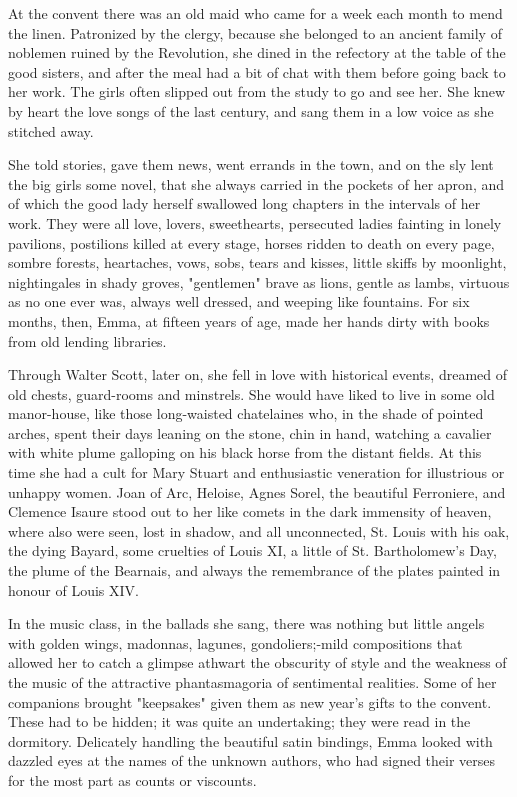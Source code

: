 \documentclass[11pt,twocolumn]{ltugboat}
\begin{document}
At the convent there was an old maid who came for a week each month to
mend the linen. Patronized by the clergy, because she belonged to an
ancient family of noblemen ruined by the Revolution, she dined in the
refectory at the table of the good sisters, and after the meal had a bit
of chat with them before going back to her work. The girls often slipped
out from the study to go and see her. She knew by heart the love songs
of the last century, and sang them in a low voice as she stitched away.

She told stories, gave them news, went errands in the town, and on
the sly lent the big girls some novel, that she always carried in the
pockets of her apron, and of which the good lady herself swallowed
long chapters in the intervals of her work. They were all love, lovers,
sweethearts, persecuted ladies fainting in lonely pavilions, postilions
killed at every stage, horses ridden to death on every page, sombre
forests, heartaches, vows, sobs, tears and kisses, little skiffs by
moonlight, nightingales in shady groves, "gentlemen" brave as lions,
gentle as lambs, virtuous as no one ever was, always well dressed, and
weeping like fountains. For six months, then, Emma, at fifteen years of
age, made her hands dirty with books from old lending libraries.

Through Walter Scott, later on, she fell in love with historical events,
dreamed of old chests, guard-rooms and minstrels. She would have liked
to live in some old manor-house, like those long-waisted chatelaines
who, in the shade of pointed arches, spent their days leaning on the
stone, chin in hand, watching a cavalier with white plume galloping on
his black horse from the distant fields. At this time she had a cult
for Mary Stuart and enthusiastic veneration for illustrious or unhappy
women. Joan of Arc, Heloise, Agnes Sorel, the beautiful Ferroniere, and
Clemence Isaure stood out to her like comets in the dark immensity of
heaven, where also were seen, lost in shadow, and all unconnected, St.
Louis with his oak, the dying Bayard, some cruelties of Louis XI, a
little of St. Bartholomew's Day, the plume of the Bearnais, and always
the remembrance of the plates painted in honour of Louis XIV.

In the music class, in the ballads she sang, there was nothing but
little angels with golden wings, madonnas, lagunes, gondoliers;-mild
compositions that allowed her to catch a glimpse athwart the obscurity
of style and the weakness of the music of the attractive phantasmagoria
of sentimental realities. Some of her companions brought "keepsakes"
given them as new year's gifts to the convent. These had to be hidden;
it was quite an undertaking; they were read in the dormitory. Delicately
handling the beautiful satin bindings, Emma looked with dazzled eyes at
the names of the unknown authors, who had signed their verses for the
most part as counts or viscounts.
\end{document}
